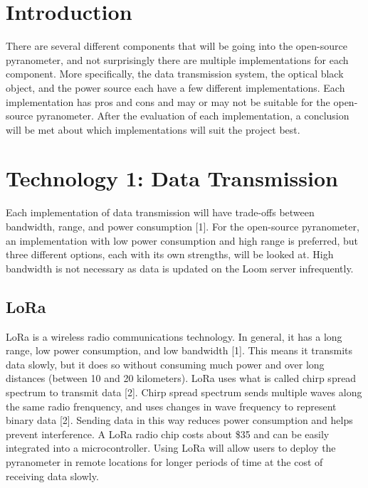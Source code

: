 \documentclass[10pt,draftclsnofoot,onecolumn,letterpaper]{article}
\begin{document}
\newpage
{}
\tableofcontents
\clearpage

\section{Introduction}
There are  several different components that will be going into the open-source pyranometer, and not surprisingly there are multiple implementations for each component. More specifically, the data transmission system, the optical black object, and the power source each have a few different implementations. Each implementation has pros and cons and may or may not be suitable for the open-source pyranometer. After the evaluation of each implementation, a conclusion will be met about which implementations will suit the project best.

\section{Technology 1: Data Transmission}
Each implementation of data transmission will have trade-offs between bandwidth, range, and power consumption [1]. For the open-source pyranometer, an implementation with low power consumption and high range is preferred, but three different options, each with its own strengths, will be looked at. High bandwidth is not necessary as data is updated on the Loom server infrequently.

\subsection{LoRa}
LoRa is a wireless radio communications technology. In general, it has a long range, low power consumption, and low bandwidth [1]. This means it transmits data slowly, but it does so without consuming much power and over long distances (between 10 and 20 kilometers). LoRa uses what is called chirp spread spectrum to transmit data [2]. Chirp spread spectrum sends multiple waves along the same radio frenquency, and uses changes in wave frequency to represent binary data [2]. Sending data in this way reduces power consumption and helps prevent interference. A LoRa radio chip costs about \$35 and can be easily integrated into a microcontroller. Using LoRa will allow users to deploy the pyranometer in remote locations for longer periods of time at the cost of receiving data slowly.
\end{document}
